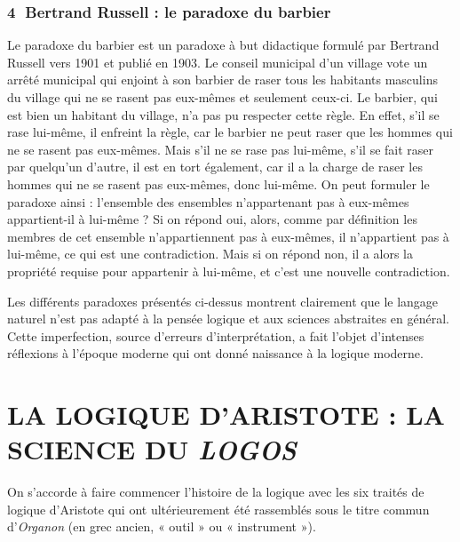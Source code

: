 \subsubsection*{\textcircled{\scriptsize 4} Bertrand Russell : le paradoxe du barbier}
Le paradoxe du barbier est un paradoxe à but didactique formulé par Bertrand Russell vers 1901 et publié en 1903. Le conseil municipal d’un village vote un arrêté municipal qui enjoint à son barbier de raser tous les habitants masculins du village qui ne se rasent pas eux-mêmes et seulement ceux-ci. Le barbier, qui est bien un habitant du village, n’a pas pu respecter cette règle. En effet, s’il se rase lui-même, il enfreint la règle, car le barbier ne peut raser que les hommes qui ne se rasent pas eux-mêmes. Mais s’il ne se rase pas lui-même, s’il se fait raser par quelqu’un d’autre, il est en tort également, car il a la charge de raser les hommes qui ne se rasent pas eux-mêmes, donc lui-même. On peut formuler le paradoxe ainsi : l’ensemble des ensembles n’appartenant pas à eux-mêmes appartient-il à lui-même ? Si on répond oui, alors, comme par définition les membres de cet ensemble n’appartiennent pas à eux-mêmes, il n’appartient pas à lui-même, ce qui est une contradiction. Mais si on répond non, il a alors la propriété requise pour appartenir à lui-même, et c’est une nouvelle contradiction.

Les différents paradoxes présentés ci-dessus montrent clairement que le langage naturel n’est pas
adapté à la pensée logique et aux sciences abstraites en général. Cette imperfection, source d’erreurs d’interprétation, a fait l’objet d’intenses réflexions à l’époque moderne qui ont donné naissance à la logique moderne.

\section{LA LOGIQUE D’ARISTOTE : LA SCIENCE DU \textit{LOGOS}}
On s’accorde à faire commencer l’histoire de la logique avec les six traités de logique d’Aristote qui ont ultérieurement été rassemblés sous le titre commun d’\textit{Organon} (en grec ancien, « outil » ou « instrument »).

